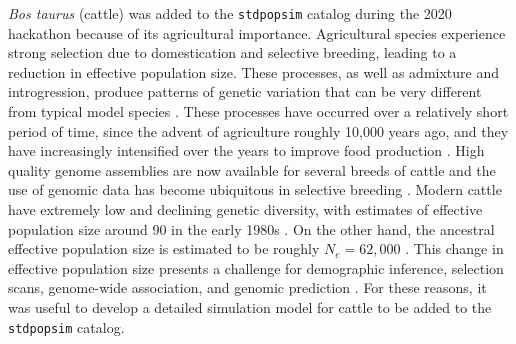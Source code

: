 \documentclass[hidelinks]{article}
\newcommand{\stdpopsim}{\texttt{stdpopsim}\xspace}
\begin{document}
\emph{Bos taurus} (cattle) was added to the \stdpopsim catalog during the 2020 hackathon because of its agricultural importance. Agricultural species experience
strong selection due to domestication and selective breeding, leading
to a reduction in effective population size. These processes,
as well as admixture and introgression, produce patterns
of genetic variation that can be very different from typical model
species \citep{Larson2013}. These processes have occurred over a
relatively short period of time, since the advent of agriculture roughly 10,000 years ago, and they have increasingly intensified over the years to improve food production \citep{Gaut2018,MacLeod2013}. High quality genome assemblies are now
available for several breeds of cattle \citep[e.g.,][]{Rosen2020, Heaton2021,
Talenti2022} and the use of genomic data has become ubiquitous
in selective breeding \citep{Meuwissen2001,MacLeod2014, Obsteter2021, Cesarani2022}.
Modern cattle have extremely low and declining genetic diversity,
with estimates of effective population size around 90 in the early 1980s \citep{MacLeod2013, VanRaden2020, Makanjouloa2020}.
On the other hand, the ancestral effective population size is estimated to be roughly $N_e=62,000$ \citep{MacLeod2013}.
This change in effective population size presents a challenge for demographic inference, 
selection scans, genome-wide association, and genomic prediction
\citep{MacLeod2013,MacLeod2014,Hartfield2022}. 
For these reasons, it was useful to develop a detailed simulation model for cattle to be added to the \stdpopsim catalog.
\end{document}
